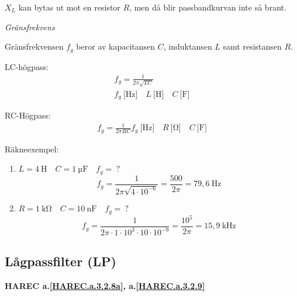 \(X_L\) kan bytas ut mot en resistor \(R\), men då blir passbandkurvan inte så
brant.

\emph{Gränsfrekvens}

Gränsfrekvensen \(f_g\) beror av kapacitansen \(C\), induktansen \(L\) samt
resistansen \(R\).

LC-högpass:
\begin{gather*}
  f_g = \frac{1}{2π\sqrt{LC}} \\
  f_g\ \text{[Hz]} \quad L\ \text{[H]} \quad C\ \text{[F]}
\end{gather*}

RC-Högpass:
\begin{gather*}
  f_g = \frac{1}{2πRC}
  f_g\ \text{[Hz]} \quad R\ \text{[Ω]} \quad C\ \text{[F]}
\end{gather*}

Räkneexempel:
\begin{enumerate}
\item \(L = 4\ \text{H} \quad C = 1\ \text{µF} \quad f_g =\ ?\)
  \[
  f_g = \frac{1}{2π\sqrt{4 \cdot 10^{-6}}} = \frac{500}{2π}
  = 79,6\ \text{Hz}
  \]
\item \(R = 1\ \text{kΩ} \quad C = 10\ \text{nF} \quad f_g =\ ?\)
  \[
    f_g = \frac{1}{2π \cdot 1 \cdot 10^3 \cdot 10 \cdot 10^{-9}}
    = \frac{10^5}{2π} = 15,9\ \text{kHz}
  \]
\end{enumerate}

\subsection{Lågpassfilter (LP)}
\textbf{HAREC
  a.\ref{HAREC.a.3.2.8a}\label{myHAREC.a.3.2.8a},
  a.\ref{HAREC.a.3.2.9}\label{myHAREC.a.3.2.9b}
}

